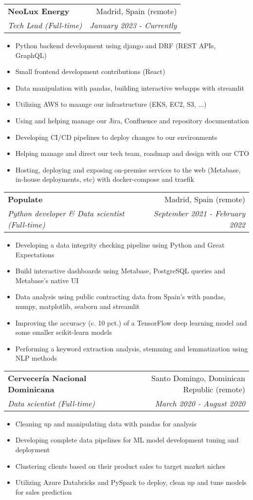 \documentclass[a4paper,20pt]{article}
\makeatletter
\newcommand{\resumeSubheading}[4]{
  \vspace{-1pt}\item
    \begin{tabular*}{0.97\textwidth}{l@{\extracolsep{\fill}}r}
      \textbf{#1} & #2 \\
      \textit{#3} & \textit{#4} \\
    \end{tabular*}\vspace{-5pt}
}
\makeatother
\begin{document}
  \resumeSubheading{NeoLux Energy}{Madrid, Spain (remote)}
    {Tech Lead (Full-time)}{January 2023 - Currently}
\begin{itemize} \itemsep-0.24em
  \item Python backend development using django and DRF (REST APIs, GraphQL)
  \item Small frontend development contributions (React)
  \item Data manipulation with pandas, building interactive webapps with streamlit
  \item Utilizing AWS to maange our infrastructure (EKS, EC2, S3, ...)
  \item Using and helping manage our Jira, Confluence and repository documentation
  \item Developing CI/CD pipelines to deploy changes to our environments
  \item Helping manage and direct our tech team, roadmap and design with our CTO
  \item Hosting, deploying and exposing on-premise services to the web (Metabase, in-house deployments, etc) with docker-compose and traefik
\end{itemize}
\vspace{-3pt}
  \resumeSubheading{Populate}{Madrid, Spain (remote)}
    {Python developer \& Data scientist (Full-time)}{September 2021 - February 2022}
\begin{itemize} \itemsep-0.24em
  \item Developing a data integrity checking pipeline using Python and Great Expectations
  \item Build interactive dashboards using Metabase, PostgreSQL queries and Metabase's native UI
  \item Data analysis using public contracting data from Spain's with pandas, numpy, matplotlib, seaborn and streamlit
  \item Improving the accuracy (c. 10 pct.) of a TensorFlow deep learning model and some smaller scikit-learn models
  \item Performing a keyword extraction analysis, stemming and lemmatization using NLP methods
\end{itemize}
\vspace{-3pt}
  \resumeSubheading{Cervecería Nacional Dominicana}{Santo Domingo, Dominican Republic (remote)}
    {Data scientist (Full-time)}{March 2020 - August 2020}
\begin{itemize} \itemsep-0.24em
  \item Cleaning up and manipulating data with pandas for analysis
  \item Developing complete data pipelines for ML model development tuning and deployment
  \item Clustering clients based on their product sales to target market niches
  \item Utilizing Azure Databricks and PySpark to deploy, clean up and tune models for sales prediction
\end{itemize}
\end{document}
